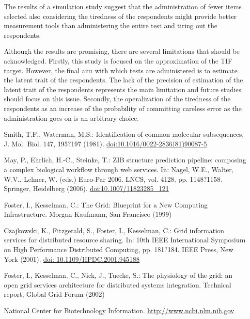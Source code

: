 \documentclass{svproc}
\begin{document}
The results of a simulation study suggest that the administration of fewer items selected also considering the tiredness of the respondents might provide better measurement tools  than administering the entire test and tiring out the respondents. 

Although the results are promising, there are several limitations that should be acknowledged. Firstly, this study is focused on the approximation of the TIF target. However, the final aim with which tests are administered is to estimate the latent trait of the respondents. The lack of the precision of estimation of the latent trait of the respondents represents the main limitation and future studies should focus on this issue. 
Secondly, the operalization of the tiredness of the respondents as an increase of the probability of committing careless error as the administration goes on is an arbitrary choice.




%
\begin{thebibliography}{6}
%

Smith, T.F., Waterman, M.S.: Identification of common molecular subsequences.
J. Mol. Biol. 147, 195?197 (1981). \url{doi:10.1016/0022-2836(81)90087-5}

May, P., Ehrlich, H.-C., Steinke, T.: ZIB structure prediction pipeline:
composing a complex biological workflow through web services.
In: Nagel, W.E., Walter, W.V., Lehner, W. (eds.) Euro-Par 2006.
LNCS, vol. 4128, pp. 1148?1158. Springer, Heidelberg (2006).
\url{doi:10.1007/11823285_121}

Foster, I., Kesselman, C.: The Grid: Blueprint for a New Computing Infrastructure.
Morgan Kaufmann, San Francisco (1999)

Czajkowski, K., Fitzgerald, S., Foster, I., Kesselman, C.: Grid information services
for distributed resource sharing. In: 10th IEEE International Symposium
on High Performance Distributed Computing, pp. 181?184. IEEE Press, New York (2001).
\url{doi: 10.1109/HPDC.2001.945188}

Foster, I., Kesselman, C., Nick, J., Tuecke, S.: The physiology of the grid: an open grid services architecture for distributed systems integration. Technical report, Global Grid
Forum (2002)

National Center for Biotechnology Information. \url{http://www.ncbi.nlm.nih.gov}


\end{thebibliography}
\end{document}
